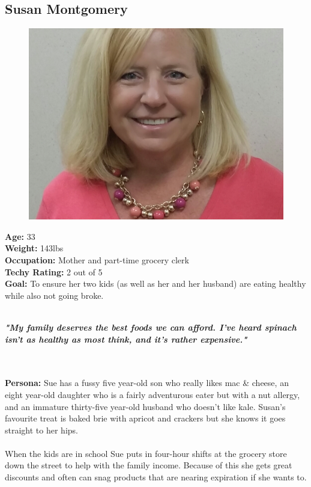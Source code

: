 \documentclass[a4paper,12pt]{article}
\begin{document}
\begin{appendices}
\subsection{Susan Montgomery}
\begin{figure}
  \begin{center}
	\includegraphics[scale=0.23]{Susan.jpg}
  \end{center}
\end{figure}
\textbf{Age:} 33\\
\textbf{Weight:} 143lbs\\
\textbf{Occupation:} Mother and part-time grocery clerk\\
\textbf{Techy Rating:} 2 out of 5\\
\textbf{Goal:} To ensure her two kids (as well as her and her husband) are eating healthy while also not going broke.\\
\\
\begin{large}
\textbf{\textit{"My family deserves the best foods we can afford.  I've heard spinach isn't as healthy as most think, and it's rather expensive."}}
\end{large}\\\\
\textbf{Persona:} Sue has a fussy five year-old son who really likes mac \& cheese, an eight year-old daughter who is a fairly adventurous eater but with a nut allergy, and an immature thirty-five year-old husband who doesn't like kale.  Susan's favourite treat is baked brie with apricot and crackers but she knows it goes straight to her hips.\\
\\
When the kids are in school Sue puts in four-hour shifts at the grocery store down the street to help with the family income.  Because of this she gets great discounts and often can snag products that are nearing expiration if she wants to.\\
\newpage

\end{appendices}
\end{document}
